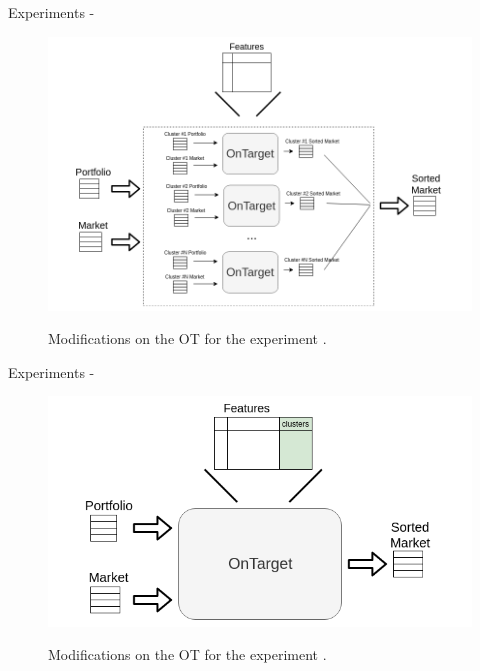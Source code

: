 
\begin{frame}{Experiments - \fullNameExperimentI{}}
    \begin{figure}
        \centering
        \includegraphics[width=.9\linewidth]{fig/ch3-one-run-each-cluster.png}
        \label{fig:one-run-each-cluster}
        \caption{Modifications on the OT for the experiment \nameExperimentI{}.} 
    \end{figure}
\end{frame}


\begin{frame}{Experiments - \fullNameExperimentII{}}
    \begin{figure}
        \centering
        \includegraphics[width=\linewidth]{fig/ch3-clusters-as-features.png}
        \label{fig:clusters-as-features}
        \caption{Modifications on the OT for the experiment \nameExperimentII{}.} 
    \end{figure}
\end{frame}